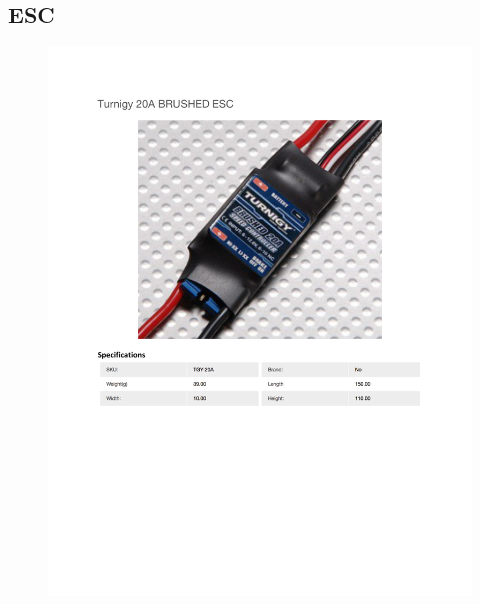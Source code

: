 \documentclass[../main.tex]{subfiles}
\begin{document}
\subsection{ESC \cite{ESC}} \label{ESC}
\begin{figure}[H]
	\centering
	\includegraphics[width=\textwidth]{img/specs/esc.pdf}
\end{figure}

\end{document}
